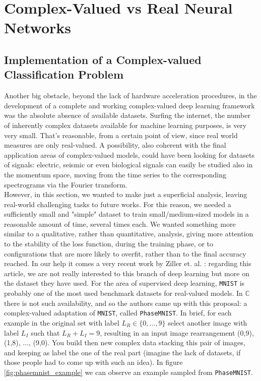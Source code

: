 \documentclass[../main.tex]{subfiles}
\begin{document}
	
\chapter{Complex-Valued vs Real Neural Networks}



\section{Implementation of a Complex-valued Classification Problem}

Another big obstacle, beyond the lack of hardware acceleration procedures, in the development of a complete and working complex-valued deep learning framework was the absolute absence of available datasets. Surfing the internet, the number of inherently complex datasets available for machine learning purposes, is very very small. That's reasonable, from a certain point of view, since real world measures are only real-valued. A possibility, also coherent with the final application areas of complex-valued models, could have been looking for datasets of signals: electric, seismic or even biological signals can easily be studied also in the momentum space, moving from the time series to the corresponding spectrograms via the Fourier transform.\\
However, in this section, we wanted to make just a superficial analysis, leaving real-world challenging tasks to future works. For this reason, we needed a sufficiently small and "simple" dataset to train small/medium-sized models in a reasonable amount of time, several times each. We wanted something more similar to a qualitative, rather than quantitative, analysis, giving more attention to the stability of the loss function, during the training phase, or to configurations that are more likely to overfit, rather than to the final accuracy reached.
In our help it comes a very recent work by Ziller et. al. \cite{ziller2021complexvalued}: regarding this article, we are not really interested to this branch of deep learning but more on the dataset they have used. For the area of supervised deep learning, \texttt{MNIST} is probably one of the most used benchmark datasets for real-valued models. In $\mathds{C}$ there is not such availability, and so the authors came up with this proposal: a complex-valued adaptation of \texttt{MNIST}, called \texttt{PhaseMNIST}. In brief, for each example in the original set with label $L_R\in\{0,\dots,9\}$ select another image with label $L_I$ such that $L_R + L_I = 9$, resulting in an input image rearrangement  (0,9), (1,8), ..., (9,0). You build then new complex data stacking this pair of images, and keeping as label the one of the real part (imagine the lack of datasets, if those people had to come up with such an idea). In figure \ref{fig:phasemnist_example} we can observe an example sampled from \texttt{PhaseMNIST}. 
\end{document}
